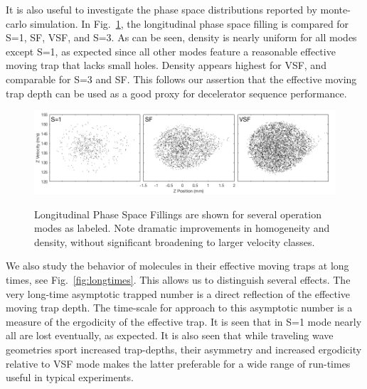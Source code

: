 \documentclass[%
 reprint,
 amsmath,amssymb,
 aps,
prl,
]{revtex4-1}
\begin{document}
It is also useful to investigate the phase space distributions reported by monte-carlo simulation.
In Fig.~\ref{fig:phasespace}, the longitudinal phase space filling is compared for S=1, SF, VSF, and S=3. 
As can be seen, density is nearly uniform for all modes except S=1, as expected since all other modes feature a reasonable effective moving trap that lacks small holes. 
Density appears highest for VSF, and comparable for S=3 and SF. 
This follows our assertion that the effective moving trap depth can be used as a good proxy for decelerator sequence performance.

\begin{figure}[t]
\includegraphics[width=\linewidth]{S=1_SF_VSF.png}
\label{fig:phasespace}
\caption{
Longitudinal Phase Space Fillings are shown for several operation modes as labeled. Note dramatic improvements in homogeneity and density, without significant broadening to larger velocity classes.
}
\end{figure}

We also study the behavior of molecules in their effective moving traps at long times, see Fig.~\ref{fig:longtimes}.
This allows us to distinguish several effects. 
The very long-time asymptotic trapped number is a direct reflection of the effective moving trap depth.
The time-scale for approach to this asymptotic number is a measure of the ergodicity of the effective trap.
It is seen that in S=1 mode nearly all are lost eventually, as expected.
It is also seen that while traveling wave geometries sport increased trap-depths, their asymmetry and increased ergodicity relative to VSF mode makes the latter preferable for a wide range of run-times useful in typical experiments.


\end{document}

